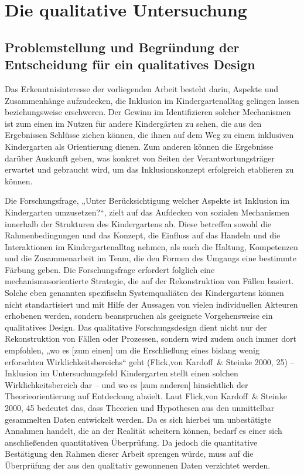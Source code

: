 \part{Die qualitative Untersuchung}
\chapter{Problemstellung und Begründung der Entscheidung für ein qualitatives Design}

Das Erkenntnisinteresse der vorliegenden Arbeit besteht darin, Aspekte und Zusammenhänge aufzudecken, die Inklusion im Kindergartenalltag gelingen lassen beziehungsweise erschweren. Der Gewinn im Identifizieren solcher Mechanismen ist zum einen im Nutzen für andere Kindergärten zu sehen, die aus den Ergebnissen Schlüsse ziehen können, die ihnen auf dem Weg zu einem inklusiven Kindergarten als Orientierung dienen. Zum anderen können die Ergebnisse darüber Auskunft geben, was konkret von Seiten der Verantwortungsträger erwartet und gebraucht wird, um das Inklusionskonzept erfolgreich etablieren zu können.

Die Forschungsfrage, „Unter Berücksichtigung welcher Aspekte ist Inklusion im Kindergarten umzusetzen?“, zielt auf das Aufdecken von sozialen Mechanismen innerhalb der Strukturen des Kindergartens ab. Diese betreffen sowohl die Rahmenbedingungen und das Konzept, die  Einfluss auf das Handeln und die Interaktionen im Kindergartenalltag nehmen, als auch die Haltung, Kompetenzen und die Zusammenarbeit im Team, die den Formen des Umgangs eine bestimmte Färbung geben. Die Forschungsfrage erfordert folglich eine mechanismusorientierte Strategie, die auf der Rekonstruktion von Fällen basiert. Solche eben genannten spezifischn Systemqualiäten des Kindergartens können nicht standartisiert und mit Hilfe der Aussagen von vielen individuellen Akteuren erhobenen werden, sondern beanspruchen als geeignete Vorgehensweise ein  
qualitatives Design. Das qualitative Forschungsdesign dient nicht nur der Rekonstruktion von Fällen oder Prozessen, sondern wird zudem auch immer dort empfohlen, „wo es [zum einen] um die Erschließung eines bislang wenig erforschten Wirklichkeitsbereichs“ geht (Flick,von Kardoff~\& Steinke 2000, 25) -- Inklusion im Untersuchungsfeld Kindergarten stellt einen solchen Wirklichkeitsbereich dar -- und wo es [zum anderen] hinsichtlich der Theorieorientierung auf Entdeckung abzielt.
Laut Flick,von Kardoff~\& Steinke 2000, 45 bedeutet das, dass Theorien und Hypothesen aus den unmittelbar gesammelten Daten entwickelt werden. Da es sich hierbei um unbestätigte Annahmen handelt, die an der Realität scheitern können, bedarf es einer sich anschließenden  quantitativen Überprüfung. 
Da jedoch die quantitative Bestätigung den Rahmen dieser Arbeit sprengen würde, muss auf die Überprüfung der aus den qualitativ gewonnenen Daten verzichtet werden.

